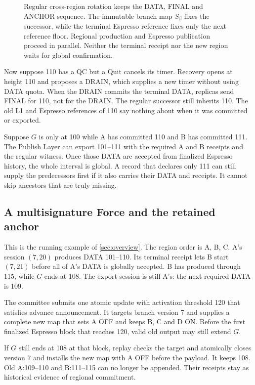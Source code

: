 \documentclass[11pt,a4paper]{article}
\begin{document}
\begin{figure}[htbp]\centering

\caption{Regular cross-region rotation keeps the DATA, FINAL and ANCHOR
sequence. The immutable branch map $S_\beta$ fixes the successor, while
the terminal Espresso reference fixes only the next reference floor.
Regional production and Espresso publication proceed in parallel. Neither
the terminal receipt nor the new region waits for global confirmation.}
\label{fig:regular-cross-region}
\end{figure}
\FloatBarrier

Now suppose 110 has a QC but a Quit cancels its timer. Recovery opens at
height 110 and proposes a DRAIN, which supplies a new timer without using
DATA quota. When the DRAIN commits the terminal DATA, replicas send FINAL
for 110, not for the DRAIN. The regular successor still inherits 110. The
old L1 and Espresso references of 110 say nothing about when it was
committed or exported.

Suppose $G$ is only at 100 while A has committed 110 and B has committed
111. The Publish Layer can export 101--111 with the required A and B
receipts and the regular witness. Once those DATA are accepted from
finalized Espresso history, the whole interval is global. A record that
declares only 111 can still supply the predecessors first if it also
carries their DATA and receipts. It cannot skip ancestors that are truly
missing.

\subsection{A multisignature Force and the retained anchor}
\label{sec:force-example}
This is the running example of \cref{sec:overview}. The region order is
A, B, C. A's session $(7,20)$ produces DATA 101--110. Its terminal receipt
lets B start $(7,21)$ before all of A's DATA is globally accepted. B has
produced through 115, while $G$ ends at 108. The export session is still
A's: the next required DATA is 109.

The committee submits one atomic update with activation threshold 120
that satisfies advance announcement. It targets branch version 7 and
supplies a complete new map that sets A OFF and keeps B, C and D ON.
Before the first finalized Espresso block that
reaches 120, valid old output may still extend $G$.

If $G$ still ends at 108 at that block, replay checks the target and
atomically closes version 7 and installs the new map with A OFF before
the payload. It keeps 108. Old
A:109--110 and B:111--115 can no longer be appended. Their receipts stay
as historical evidence of regional commitment.
\end{document}
